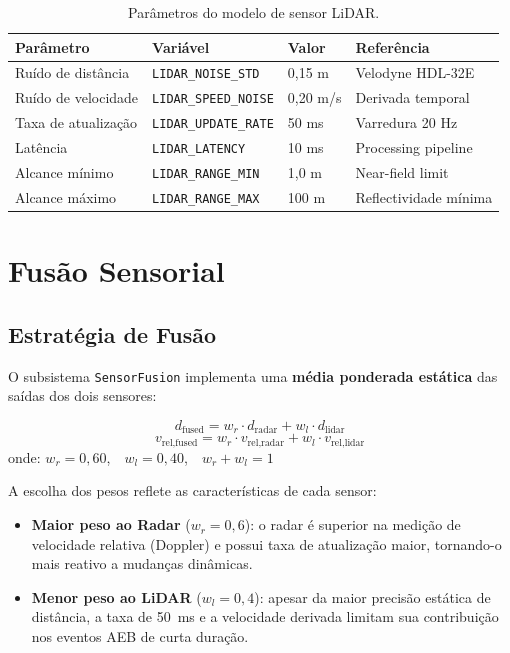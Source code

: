 \documentclass[12pt,a4paper]{article}
\begin{document}
\begin{table}[H]
\centering
\caption{Par\^ametros do modelo de sensor LiDAR.}
\begin{tabularx}{\linewidth}{lXXX}
\toprule
\rowcolor{azulescuro}
\color{white}\textbf{Par\^ametro} &
\color{white}\textbf{Vari\'avel} &
\color{white}\textbf{Valor} &
\color{white}\textbf{Refer\^encia} \\
\midrule
\rowcolor{azulclaro!40}
Ru\'ido de dist\^ancia & \texttt{LIDAR\_NOISE\_STD}   & 0,15 m   & Velodyne HDL-32E \\
Ru\'ido de velocidade  & \texttt{LIDAR\_SPEED\_NOISE} & 0,20 m/s & Derivada temporal \\
\rowcolor{azulclaro!40}
Taxa de atualiza\c{c}\~ao & \texttt{LIDAR\_UPDATE\_RATE} & 50 ms & Varredura 20 Hz \\
Lat\^encia              & \texttt{LIDAR\_LATENCY}      & 10 ms & Processing pipeline \\
\rowcolor{azulclaro!40}
Alcance m\'inimo        & \texttt{LIDAR\_RANGE\_MIN}   & 1,0 m & Near-field limit \\
Alcance m\'aximo        & \texttt{LIDAR\_RANGE\_MAX}   & 100 m & Reflectividade m\'inima \\
\bottomrule
\end{tabularx}
\end{table}

\section{Fus\~ao Sensorial}

\subsection{Estrat\'egia de Fus\~ao}

O subsistema \texttt{SensorFusion} implementa uma \textbf{m\'edia ponderada est\'atica}
das sa\'idas dos dois sensores:

\begin{equacaobox}
\[
d_{\text{fused}} = w_r \cdot d_{\text{radar}} + w_l \cdot d_{\text{lidar}}
\]
\[
v_{\text{rel,fused}} = w_r \cdot v_{\text{rel,radar}} + w_l \cdot v_{\text{rel,lidar}}
\]
onde: $w_r = 0{,}60$,\ \ $w_l = 0{,}40$,\ \ $w_r + w_l = 1$
\end{equacaobox}

A escolha dos pesos reflete as caracter\'isticas de cada sensor:
\begin{itemize}
  \item \textbf{Maior peso ao Radar} ($w_r = 0{,}6$): o radar \'e superior na
    medi\c{c}\~ao de velocidade relativa (Doppler) e possui taxa de atualiza\c{c}\~ao
    maior, tornando-o mais reativo a mudan\c{c}as din\^amicas.
  \item \textbf{Menor peso ao LiDAR} ($w_l = 0{,}4$): apesar da maior precis\~ao
    est\'atica de dist\^ancia, a taxa de 50~ms e a velocidade derivada limitam
    sua contribui\c{c}\~ao nos eventos AEB de curta dura\c{c}\~ao.
\end{itemize}
\end{document}
